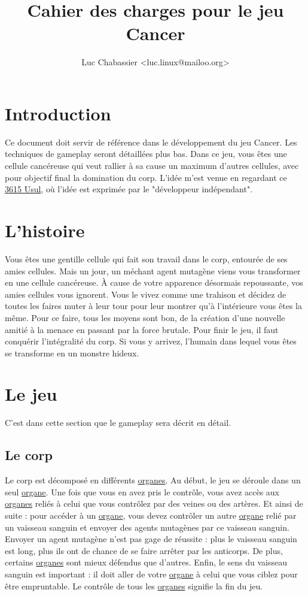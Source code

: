 \documentclass{article}
\title{Cahier des charges pour le jeu Cancer}
\author{Luc Chabassier <luc.linux@mailoo.org>}
\begin{document}
\maketitle

\tableofcontents

\section{Introduction}
Ce document doit servir de référence dans le développement du jeu Cancer. Les techniques de gameplay seront détaillées plus bas. Dans ce jeu, vous êtes une cellule cancéreuse qui veut rallier à sa cause un maximum d'autres cellules, avec pour objectif final la domination du corp. L'idée m'est venue en regardant ce \href{http://www.jeuxvideo.com/chroniques-video/00000345/3615-usul-jeux-inde-00000217.htm}{3615 Usul}, où l'idée est exprimée par le "développeur indépendant".

\section{L'histoire}
Vous êtes une gentille cellule qui fait son travail dans le corp, entourée de ses amies cellules. Mais un jour, un méchant agent mutagène viens vous transformer en une cellule cancéreuse. À cause de votre apparence désormais repoussante, vos amies cellules vous ignorent. Vous le vivez comme une trahison et décidez de toutes les faires muter à leur tour pour leur montrer qu'à l'intérieure vous êtes la même. Pour ce faire, tous les moyens sont bon, de la création d'une nouvelle amitié à la menace en passant par la force brutale. Pour finir le jeu, il faut conquérir l'intégralité du corp. Si vous y arrivez, l'humain dans lequel vous êtes se transforme en un monstre hideux.

\section{Le jeu}
C'est dans cette section que le gameplay sera décrit en détail.

\subsection{Le corp}\label{corp}
Le corp est décomposé en différents \hyperref[organe]{organes}. Au début, le jeu se déroule dans un seul \hyperref[organe]{organe}. Une fois que vous en avez pris le contrôle, vous avez accès aux \hyperref[organe]{organes} reliés à celui que vous contrôlez par des veines ou des artères. Et ainsi de suite : pour accéder à un \hyperref[organe]{organe}, vous devez contrôler un autre \hyperref[organe]{organe} relié par un vaisseau sanguin et envoyer des agents mutagènes par ce vaisseau sanguin. Envoyer un agent mutagène n'est pas gage de réussite : plus le vaisseau sanguin est long, plus ils ont de chance de se faire arrêter par les anticorps. De plus, certains \hyperref[organe]{organes} sont mieux défendus que d'autres. Enfin, le sens du vaisseau sanguin est important : il doit aller de votre \hyperref[organe]{organe} à celui que vous ciblez pour être empruntable. Le contrôle de tous les \hyperref[organe]{organes} signifie la fin du jeu.
\end{document}

